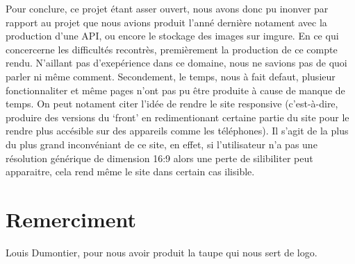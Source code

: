 \documentclass[12pt]{article}
\begin{document}
    Pour conclure, ce projet étant asser ouvert, nous avons donc pu inonver par 
    rapport au projet que nous avions produit l'anné dernière notament avec la 
    production d'une API, ou encore le stockage des images sur imgure. En ce qui 
    concercerne les difficultés recontrès, premièrement la production de ce 
    compte rendu. N'aillant pas d'exepérience dans ce domaine, nous ne savions 
    pas de quoi parler ni même comment. Secondement, le temps, nous à fait 
    defaut, plusieur fonctionnaliter et même pages n'ont pas pu être produite 
    à cause de manque de temps. On peut notament citer l'idée de rendre le site 
    responsive (c'est-à-dire, produire des versions du `front' en redimentionant 
    certaine partie du site pour le rendre plus accésible sur des appareils
    comme les téléphones). Il s'agit de la plus du plus grand inconvéniant de ce 
    site, en effet, si l'utilisateur n'a pas une résolution générique de 
    dimension 16:9 alors une perte de silibiliter peut apparaitre, cela rend 
    même le site dans certain cas ilisible.   

    \section{Remerciment}

    Louis Dumontier, pour nous avoir produit la taupe qui nous sert de logo.
    
\end{document}
